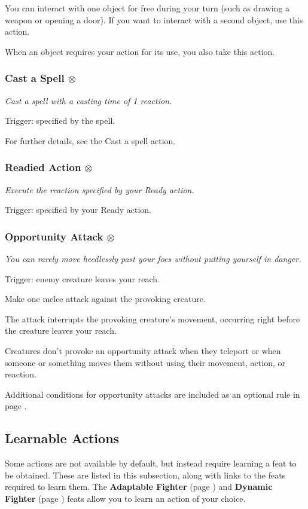     You can interact with one object for free during your turn (such as drawing a weapon or opening a door).
    If you want to interact with a second object, use this action.

    When an object requires your action for its use, you also take this action.
\subsubsection{Cast a Spell $\otimes$} \label{act::castaspellreact}
    \textit{Cast a spell with a casting time of 1 reaction.}

    Trigger: specified by the spell.

    For further details, see the Cast a spell action.
\subsubsection{Readied Action $\otimes$} \label{act::readiedaction}
    \textit{Execute the reaction specified by your Ready action.}

    Trigger: specified by your Ready action.
\subsubsection{Opportunity Attack $\otimes$} \label{act::opportunityattack}
    \textit{You can rarely move heedlessly past your foes without putting yourself in danger.}

    Trigger: enemy creature leaves your reach.

    Make one melee attack against the provoking creature.

    The attack interrupts the provoking creature's movement, occurring right before the creature leaves your reach.

    Creatures don't provoke an opportunity attack when they teleport or when someone or something moves them without using their movement, action, or reaction.

    Additional conditions for opportunity attacks are included as an optional rule in page \pageref{rule::opportunityattacks}.

\subsection*{Learnable Actions} \label{ssec::learnableableactions}
    Some actions are not available by default, but instead require learning a feat to be obtained.
    These are listed in this subsection, along with links to the feats required to learn them.
    The \textbf{Adaptable Fighter} (page \pageref{feat::adaptablefighter}) and \textbf{Dynamic Fighter} (page \pageref{feat::dynamicfighter}) feats allow you to learn an action of your choice.


